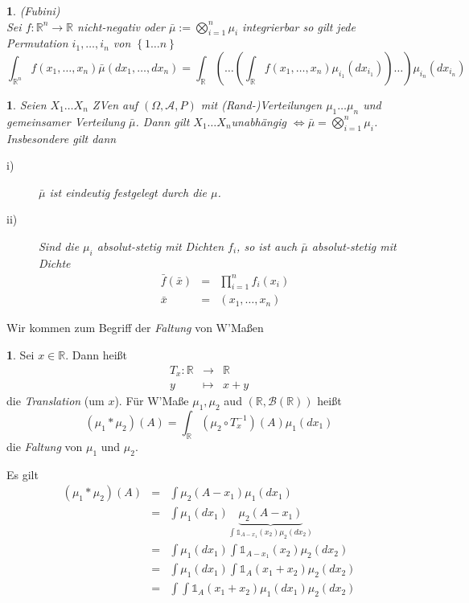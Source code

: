 \documentclass[10pt,a4paper]{report}
\numberwithin{equation}{section}
\numberwithin{figure}{section}
\theoremstyle{plain}
\theoremstyle{definition}
\newtheorem{defn}{\protect\definitionname}[section]
\theoremstyle{plain}
\newtheorem{prop}{\protect\propositionname}[section]
\theoremstyle{definition}
\theoremstyle{remark}
\theoremstyle{plain}
\theoremstyle{plain}
\theoremstyle{plain}
\theoremstyle{plain}
\newtheorem*{prop*}{\protect\propositionname}
\theoremstyle{plain}
\providecommand{\definitionname}{Definition}
\providecommand{\propositionname}{Satz}
\newcommand{\1}{ \mathbb{1} } %
\begin{document}
\begin{prop*}
(Fubini)\\
Sei $f:\mathbb{R}^{n}\to\mathbb{R}$ nicht-negativ oder $\bar{\mu}:=\bigotimes_{i=1}^{n}\mu_{i}$
integrierbar so gilt jede Permutation $i_{1},\ldots,i_{n}$ von $\left\{ 1\ldots n\right\} $
\[
\int_{\mathbb{R}^{n}}f\left(x_{1},\ldots,x_{n}\right)\bar{\mu}\left(dx_{1},\ldots,dx_{n}\right)=\int_{\mathbb{R}}\left(\ldots\left(\int_{\mathbb{R}}f\left(x_{1},\ldots,x_{n}\right)\mu_{i_{1}}\left(dx_{i_{1}}\right)\right)\ldots\right)\mu_{i_{n}}\left(dx_{i_{n}}\right)
\]
\end{prop*}
\begin{prop}
Seien $X_{1}\ldots X_{n}$ ZVen auf $\left(\Omega,\mathcal{A},P\right)$
mit (Rand-)Verteilungen $\mu_{1}\ldots\mu_{n}$ und gemeinsamer Verteilung
$\bar{\mu}$. Dann gilt $X_{1}\ldots X_{n}$unabhängig $\Leftrightarrow\bar{\mu}=\bigotimes_{i=1}^{n}\mu_{i}$.
Insbesondere gilt dann
\begin{description}
\item [{i)}] $\bar{\mu}$ ist eindeutig festgelegt durch die $\mu$. 
\item [{ii)}] Sind die $\mu_{i}$ absolut-stetig mit Dichten $f_{i}$,
so ist auch $\bar{\mu}$ absolut-stetig mit Dichte
\begin{eqnarray*}
\bar{f}\left(\bar{x}\right) & = & \prod_{i=1}^{n}f_{i}\left(x_{i}\right)\\
\bar{x} & = & \left(x_{1},\ldots,x_{n}\right)
\end{eqnarray*}

\end{description}
\end{prop}
Wir kommen zum Begriff der \emph{Faltung} von W'Maßen
\begin{defn}
Sei $x\in\mathbb{R}$. Dann heißt 
\begin{eqnarray*}
T_{x}:\mathbb{R} & \to & \mathbb{R}\\
y & \mapsto & x+y
\end{eqnarray*}
die \emph{Translation} (um $x$). Für W'Maße $\mu_{1},\mu_{2}$
aud $\left(\mathbb{R},\mathcal{B}\left(\mathbb{R}\right)\right)$
heißt 
\[
\left(\mu_{1}*\mu_{2}\right)\left(A\right)=\int_{\mathbb{R}}\left(\mu_{2}\circ T_{x}^{-1}\right)\left(A\right)\mu_{1}\left(dx_{1}\right)
\]
die \emph{Faltung} von $\mu_{1}$ und $\mu_{2}$.
\end{defn}
Es gilt
\begin{eqnarray*}
\left(\mu_{1}*\mu_{2}\right)\left(A\right) & = & \int\mu_{2}\left(A-x_{1}\right)\mu_{1}\left(dx_{1}\right)\\
 & = & \int\mu_{1}\left(dx_{1}\right)\underset{\int\1_{A-x_{1}}\left(x_{2}\right)\mu_{2}\left(dx_{2}\right)}{\underbrace{\mu_{2}\left(A-x_{1}\right)}}\\
 & = & \int\mu_{1}\left(dx_{1}\right)\int\1_{A-x_{1}}\left(x_{2}\right)\mu_{2}\left(dx_{2}\right)\\
 & = & \int\mu_{1}\left(dx_{1}\right)\int\1_{A}\left(x_{1}+x_{2}\right)\mu_{2}\left(dx_{2}\right)\\
 & = & \int\int\1_{A}\left(x_{1}+x_{2}\right)\mu_{1}\left(dx_{1}\right)\mu_{2}\left(dx_{2}\right)
\end{eqnarray*}
\end{document}
